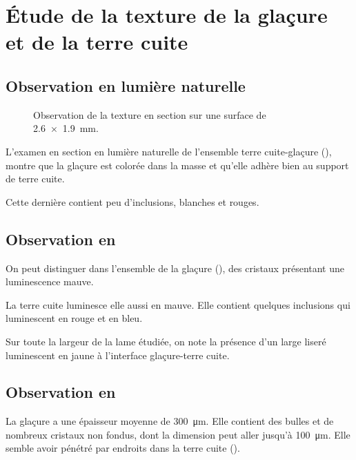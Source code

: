 \section{Étude de la texture de la glaçure et de la terre cuite}

\subsection{Observation en lumière naturelle}
\begin{figure}[htb]
  \begin{minipage}[t]{0.4\textwidth}
  \end{minipage}
  \begin{minipage}[t]{0.4\textwidth}
    \subcaption{\CL \label{texture:6529_CL}}
  \end{minipage}
  \caption{\legendeB 
           Observation de la texture en section sur une surface de 
           \SI{2.6x1.9}{\mm}.}
  \label{texture:6529}
\end{figure}

L'examen en section en lumière naturelle de l'ensemble terre 
cuite-glaçure (), montre que la glaçure est 
colorée dans la masse et qu'elle adhère bien au support de terre cuite.

Cette dernière contient peu d'inclusions, blanches et rouges.

\subsection{Observation en \CL}
On peut distinguer dans l'ensemble de la glaçure 
(), des cristaux présentant une 
luminescence mauve.

La terre cuite luminesce elle aussi en mauve. Elle contient quelques 
inclusions qui luminescent en rouge et en bleu.

Sur toute la largeur de la lame étudiée, on note la présence d'un 
large liseré luminescent en jaune à l'interface glaçure-terre cuite.


\subsection{Observation en \MEB[ie]}
La glaçure a une épaisseur moyenne de \SI{300}{\um}. Elle contient 
des bulles et de nombreux cristaux non fondus, dont la dimension peut 
aller jusqu'à \SI{100}{\um}. Elle semble avoir pénétré par endroits 
dans la terre cuite ().


